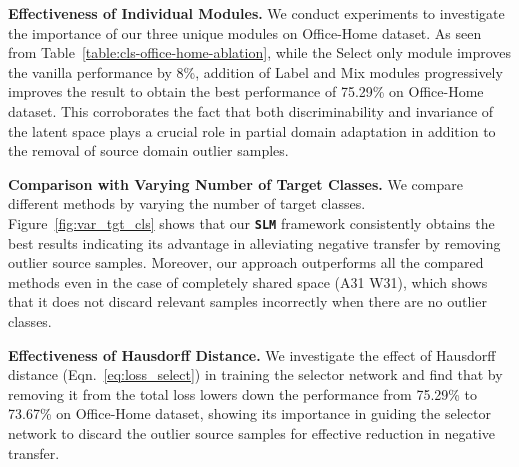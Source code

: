 \documentclass[10pt,twocolumn,letterpaper]{article}
\def\ours{\texttt{\textbf{SLM}}\xspace}
\begin{document}
\vspace{1mm}
\noindent\textbf{Effectiveness of Individual Modules.} We conduct experiments to investigate the importance of our three unique modules on Office-Home dataset. 
As seen from Table~\ref{table:cls-office-home-ablation}, while the Select only module improves the vanilla performance by 8\%, addition of Label and Mix modules progressively improves the result to obtain the best performance of 75.29\% on Office-Home dataset. This
corroborates the fact that both discriminability and invariance of the latent space plays a crucial role in partial domain adaptation in addition to the removal of source domain outlier samples. 

\vspace{1mm}
\noindent\textbf{Comparison with Varying Number of Target Classes.} We compare different methods by varying the number of target classes. Figure~\ref{fig:var_tgt_cls} shows that our \ours framework consistently obtains the best results indicating its advantage in alleviating negative transfer by removing outlier source samples. Moreover, our approach outperforms all the compared methods even in the case of completely shared space (A31  W31), which shows that it does not discard relevant samples incorrectly when there are no outlier classes. 

\vspace{1mm}
\noindent\textbf{Effectiveness of Hausdorff Distance.} We investigate the effect of Hausdorff distance (Eqn.~\ref{eq:loss_select}) in training the selector network and find that by removing it from the total loss lowers down the performance from 75.29\% to 73.67\% on Office-Home dataset, showing its importance in guiding the selector network to discard the outlier source samples for effective reduction in negative transfer.
\end{document}
